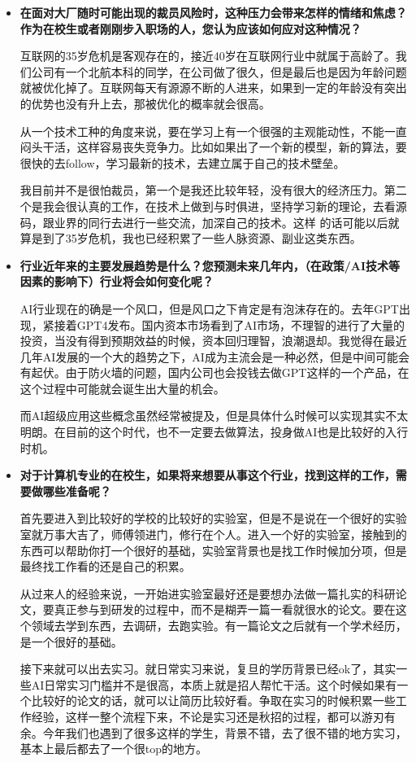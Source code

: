 \begin{itemize}
    \item \textbf{在面对大厂随时可能出现的裁员风险时，这种压力会带来怎样的情绪和焦虑？作为在校生或者刚刚步入职场的人，您认为应该如何应对这种情况？}

互联网的35岁危机是客观存在的，接近40岁在互联网行业中就属于高龄了。我们公司有一个北航本科的同学，在公司做了很久，但是最后也是因为年龄问题就被优化掉了。互联网每天有源源不断的人进来，如果到一定的年龄没有突出的优势也没有升上去，那被优化的概率就会很高。

从一个技术工种的角度来说，要在学习上有一个很强的主观能动性，不能一直闷头干活，这样容易丧失竞争力。比如如果出了一个新的模型，新的算法，要很快的去follow，学习最新的技术，去建立属于自己的技术壁垒。

我目前并不是很怕裁员，第一个是我还比较年轻，没有很大的经济压力。第二个是我会很认真的工作，在技术上做到与时俱进，坚持学习新的理论，去看源码，跟业界的同行去进行一些交流，加深自己的技术。这样 的话可能以后就算是到了35岁危机，我也已经积累了一些人脉资源、副业这类东西。

    \item \textbf{行业近年来的主要发展趋势是什么？您预测未来几年内，（在政策/AI技术等因素的影响下）行业将会如何变化呢？}

    AI行业现在的确是一个风口，但是风口之下肯定是有泡沫存在的。去年GPT出现，紧接着GPT4发布。国内资本市场看到了AI市场，不理智的进行了大量的投资，当没有得到预期效益的时候，资本回归理智，浪潮退却。我觉得在最近几年AI发展的一个大的趋势之下，AI成为主流会是一种必然，但是中间可能会有起伏。由于防火墙的问题，国内公司也会投钱去做GPT这样的一个产品，在这个过程中可能就会诞生出大量的机会。

    而AI超级应用这些概念虽然经常被提及，但是具体什么时候可以实现其实不太明朗。在目前的这个时代，也不一定要去做算法，投身做AI也是比较好的入行时机。

    \item \textbf{对于计算机专业的在校生，如果将来想要从事这个行业，找到这样的工作，需要做哪些准备呢？}

首先要进入到比较好的学校的比较好的实验室，但是不是说在一个很好的实验室就万事大吉了，师傅领进门，修行在个人。进入一个好的实验室，接触到的东西可以帮助你打一个很好的基础，实验室背景也是找工作时候加分项，但是最终找工作看的还是自己的积累。

从过来人的经验来说，一开始进实验室最好还是要想办法做一篇扎实的科研论文，要真正参与到研发的过程中，而不是糊弄一篇一看就很水的论文。要在这个领域去学到东西，去调研，去跑实验。有一篇论文之后就有一个学术经历，是一个很好的基础。

接下来就可以出去实习。就日常实习来说，复旦的学历背景已经ok了，其实一些AI日常实习门槛并不是很高，本质上就是招人帮忙干活。这个时候如果有一个比较好的论文的话，就可以让简历比较好看。争取在实习的时候积累一些工作经验，这样一整个流程下来，不论是实习还是秋招的过程，都可以游刃有余。今年我们也遇到了很多这样的学生，背景不错，去了很不错的地方实习，基本上最后都去了一个很top的地方。


\end{itemize}
